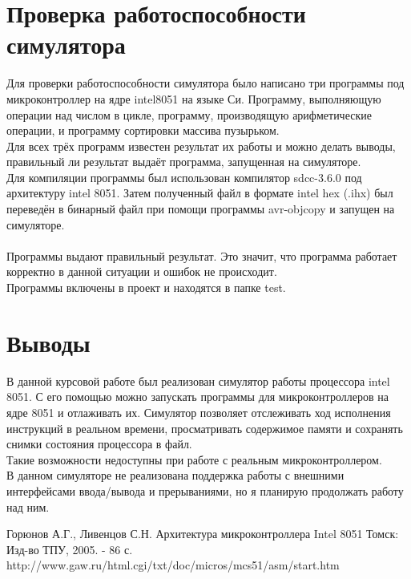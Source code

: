 \section{Проверка работоспособности симулятора}
Для проверки работоспособности симулятора было написано три программы под микроконтроллер на ядре intel8051 на языке Си. Программу, выполняющую операции над числом в цикле, программу, производящую арифметические операции, и программу сортировки массива пузырьком. \\
Для всех трёх программ известен результат их работы и можно делать выводы, правильный ли результат выдаёт программа, запущенная на симуляторе. \\
Для компиляции программы был использован компилятор sdcc-3.6.0 под архитектуру intel 8051. Затем полученный файл в формате intel hex (.ihx) был переведён в бинарный файл при помощи программы avr-objcopy и запущен на симуляторе. \\
~\\
Программы выдают правильный результат. Это значит, что программа работает корректно в данной ситуации и ошибок не происходит. \\
Программы включены в проект и  находятся в папке test.

\newpage

\section{Выводы}
В данной курсовой работе был реализован симулятор работы процессора intel 8051. С его помощью можно запускать программы для микроконтроллеров на ядре 8051 и отлаживать их. Симулятор позволяет отслеживать ход исполнения инструкций в реальном времени, просматривать содержимое памяти и сохранять снимки состояния процессора в файл. \\ Такие возможности недоступны при работе с реальным микроконтроллером. \\
В данном симуляторе не реализована поддержка работы с внешними интерфейсами ввода/вывода и прерываниями, но я планирую продолжать работу над ним. \\

\begin{thebibliography}{}
    \bibitem{} Горюнов А.Г., Ливенцов С.Н. Архитектура микроконтроллера Intel 8051 Томск: Изд-во ТПУ, 2005. - 86 с.
    \bibitem{} http://www.gaw.ru/html.cgi/txt/doc/micros/mcs51/asm/start.htm
\end{thebibliography}


